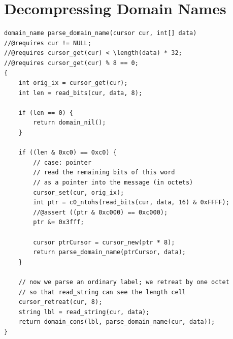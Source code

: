 \documentclass{article}
\begin{document}
\section{Decompressing Domain Names}\label{appendix:decompression}

\begin{lstlisting}
domain_name parse_domain_name(cursor cur, int[] data)
//@requires cur != NULL;
//@requires cursor_get(cur) < \length(data) * 32;
//@requires cursor_get(cur) % 8 == 0;
{
    int orig_ix = cursor_get(cur);
    int len = read_bits(cur, data, 8);

    if (len == 0) {
        return domain_nil();
    }

    if ((len & 0xc0) == 0xc0) {
        // case: pointer
        // read the remaining bits of this word
        // as a pointer into the message (in octets)
        cursor_set(cur, orig_ix);
        int ptr = c0_ntohs(read_bits(cur, data, 16) & 0xFFFF);
        //@assert ((ptr & 0xc000) == 0xc000);
        ptr &= 0x3fff;

        cursor ptrCursor = cursor_new(ptr * 8);
        return parse_domain_name(ptrCursor, data);
    }

    // now we parse an ordinary label; we retreat by one octet
    // so that read_string can see the length cell
    cursor_retreat(cur, 8);
    string lbl = read_string(cur, data);
    return domain_cons(lbl, parse_domain_name(cur, data));
}
\end{lstlisting}
\end{document}
